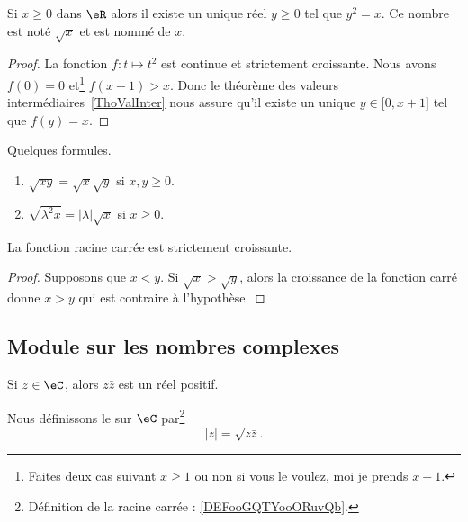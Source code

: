 \begin{corollaryDef}     \label{DEFooGQTYooORuvQb}
	Si \( x\geq 0\) dans \( \eR\) alors il existe un unique réel \( y\geq 0\) tel que \( y^2=x\). Ce nombre est noté \( \sqrt{x}\) et est nommé  de \( x\).
\end{corollaryDef}

\begin{proof}
	La fonction \( f\colon t\mapsto t^2\) est continue et strictement croissante. Nous avons \( f(0)=0\) et\footnote{Faites deux cas suivant \( x\geq 1\) ou non si vous le voulez, moi je prends \( x+1\).} \( f(x+1)>x\). Donc le théorème des valeurs intermédiaires~\ref{ThoValInter} nous assure qu'il existe un unique \( y\in\mathopen[ 0 , x+1 \mathclose]\) tel que \( f(y)=x\).
\end{proof}

\begin{lemma}       \label{LEMooWSVNooKsymDy}
	Quelques formules.
	\begin{enumerate}
		\item
		      $\sqrt{ xy }=\sqrt{ x }\sqrt{ y }$ si \( x,y\geq 0\).
		\item       \label{ITEMooEPHBooCEeJOD}
		      \( \sqrt{ \lambda^2 x }=| \lambda |\sqrt{ x }\) si \( x\geq 0\).
	\end{enumerate}
\end{lemma}

\begin{lemma}       \label{LEMooSBOAooOOIotR}
	La fonction racine carrée est strictement croissante.
\end{lemma}

\begin{proof}
	Supposons que \( x<y\). Si \( \sqrt{ x }>\sqrt{ y }\), alors la croissance de la fonction carré donne \( x>y\) qui est contraire à l'hypothèse.
\end{proof}

\subsection{Module sur les nombres complexes}

\begin{lemmaDef}        \label{LEMooVHDAooJyoakR}
	Si \( z\in \eC\), alors \( z\bar z\) est un réel positif.

	Nous définissons le  sur \( \eC\) par\footnote{Définition de la racine carrée : \ref{DEFooGQTYooORuvQb}.}
	\begin{equation}
		| z |=\sqrt{ z\bar z }.
	\end{equation}
\end{lemmaDef}

